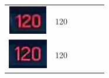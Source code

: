 \begin{table}[h!]
\begin{tabular}{c l c l c l}
\begin{minipage}{.2\textwidth}
      \includegraphics[width=\textwidth]{img/exp_number_04}
    \end{minipage}
    &
    120
    \\
    \begin{minipage}{.2\textwidth}
      \includegraphics[width=\textwidth]{img/exp_number_05}
    \end{minipage}
    &
    120
    &
    \begin{minipage}{.2\textwidth}

\end{minipage}
\end{tabular}
\end{table}
